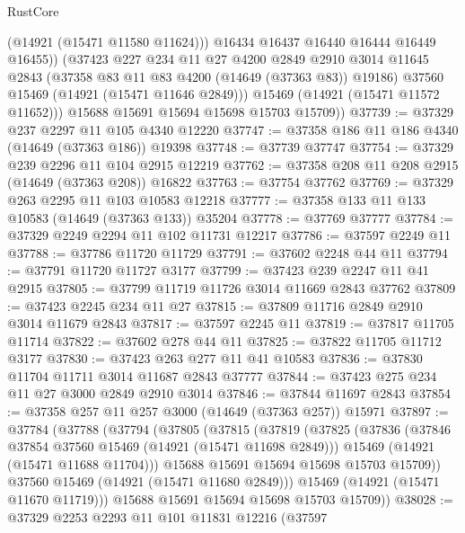 \begin{lexlean}{RustCore}
\begin{coremodule}
                (@14921 (@15471 @11580 @11624)))
              @16434
              @16437
              @16440
              @16444
              @16449
              @16455))
          (@37423
            @227
            @234
            @11
            @27
            @4200
            @2849
            @2910
            @3014
            @11645
            @2843
            (@37358 @83 @11 @83 @4200 (@14649 (@37363 @83)) @19186)
            @37560
            @15469
            (@14921 (@15471 @11646 @2849)))
          @15469
          (@14921 (@15471 @11572 @11652)))
        @15688
        @15691
        @15694
        @15698
        @15703
        @15709))
@37739 := @37329 @237 @2297 @11 @105 @4340 @12220
@37747 := @37358 @186 @11 @186 @4340 (@14649 (@37363 @186)) @19398
@37748 := @37739 @37747
@37754 := @37329 @239 @2296 @11 @104 @2915 @12219
@37762 := @37358 @208 @11 @208 @2915 (@14649 (@37363 @208)) @16822
@37763 := @37754 @37762
@37769 := @37329 @263 @2295 @11 @103 @10583 @12218
@37777 := @37358 @133 @11 @133 @10583 (@14649 (@37363 @133)) @35204
@37778 := @37769 @37777
@37784 := @37329 @2249 @2294 @11 @102 @11731 @12217
@37786 := @37597 @2249 @11
@37788 := @37786 @11720 @11729
@37791 := @37602 @2248 @44 @11
@37794 := @37791 @11720 @11727 @3177
@37799 := @37423 @239 @2247 @11 @41 @2915
@37805 := @37799 @11719 @11726 @3014 @11669 @2843 @37762
@37809 := @37423 @2245 @234 @11 @27
@37815 := @37809 @11716 @2849 @2910 @3014 @11679 @2843
@37817 := @37597 @2245 @11
@37819 := @37817 @11705 @11714
@37822 := @37602 @278 @44 @11
@37825 := @37822 @11705 @11712 @3177
@37830 := @37423 @263 @277 @11 @41 @10583
@37836 := @37830 @11704 @11711 @3014 @11687 @2843 @37777
@37844 := @37423 @275 @234 @11 @27 @3000 @2849 @2910 @3014
@37846 := @37844 @11697 @2843
@37854 := @37358 @257 @11 @257 @3000 (@14649 (@37363 @257)) @15971
@37897 := @37784
    (@37788
      (@37794
        (@37805
          (@37815
            (@37819
              (@37825
                (@37836
                  (@37846 @37854 @37560 @15469 (@14921 (@15471 @11698 @2849)))
                  @15469
                  (@14921 (@15471 @11688 @11704)))
                @15688
                @15691
                @15694
                @15698
                @15703
                @15709))
            @37560
            @15469
            (@14921 (@15471 @11680 @2849)))
          @15469
          (@14921 (@15471 @11670 @11719)))
        @15688
        @15691
        @15694
        @15698
        @15703
        @15709))
@38028 := @37329
    @2253
    @2293
    @11
    @101
    @11831
    @12216
    (@37597

\end{coremodule}
\end{lexlean}
